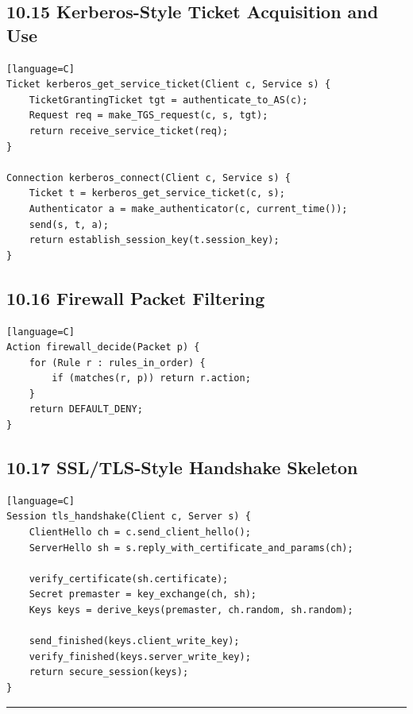 \documentclass[11pt]{article}
\begin{document}
\subsection{10.15 Kerberos-Style Ticket Acquisition and
Use}\label{kerberos-style-ticket-acquisition-and-use}

\begin{verbatim}[language=C]
Ticket kerberos_get_service_ticket(Client c, Service s) {
    TicketGrantingTicket tgt = authenticate_to_AS(c);
    Request req = make_TGS_request(c, s, tgt);
    return receive_service_ticket(req);
}

Connection kerberos_connect(Client c, Service s) {
    Ticket t = kerberos_get_service_ticket(c, s);
    Authenticator a = make_authenticator(c, current_time());
    send(s, t, a);
    return establish_session_key(t.session_key);
}
\end{verbatim}

\subsection{10.16 Firewall Packet
Filtering}\label{firewall-packet-filtering}

\begin{verbatim}[language=C]
Action firewall_decide(Packet p) {
    for (Rule r : rules_in_order) {
        if (matches(r, p)) return r.action;
    }
    return DEFAULT_DENY;
}
\end{verbatim}

\subsection{10.17 SSL/TLS-Style Handshake
Skeleton}\label{ssltls-style-handshake-skeleton}

\begin{verbatim}[language=C]
Session tls_handshake(Client c, Server s) {
    ClientHello ch = c.send_client_hello();
    ServerHello sh = s.reply_with_certificate_and_params(ch);

    verify_certificate(sh.certificate);
    Secret premaster = key_exchange(ch, sh);
    Keys keys = derive_keys(premaster, ch.random, sh.random);

    send_finished(keys.client_write_key);
    verify_finished(keys.server_write_key);
    return secure_session(keys);
}
\end{verbatim}

\begin{center}\rule{0.5\linewidth}{0.5pt}\end{center}
\end{document}

